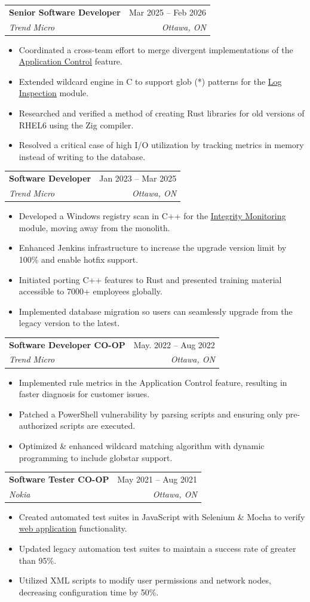 \documentclass[letterpaper,11pt]{article}
\makeatletter
\newcommand{\resumeItem}[1]{
  \item\small{
    {#1 \vspace{-2pt}}
  }
}
\newcommand{\resumeSubheading}[4]{
  \vspace{-2pt}\item
    \begin{tabular*}{0.97\textwidth}[t]{l@{\extracolsep{\fill}}r}
      \textbf{#1} & #2 \\
      \textit{\small#3} & \textit{\small #4} \\
    \end{tabular*}\vspace{-7pt}
}
\newcommand{\resumeItemListStart}{\begin{itemize}}
\newcommand{\resumeItemListEnd}{\end{itemize}\vspace{-5pt}}
\makeatother
\begin{document}
    \resumeSubheading
      {Senior Software Developer}{Mar 2025 -- Feb 2026}
      {Trend Micro}{Ottawa, ON}
      \resumeItemListStart
        \resumeItem{Coordinated a cross-team effort to merge divergent implementations of the \href{https://help.deepsecurity.trendmicro.com/20_0/on-premise/application-control.html}{\underline{Application Control}} feature.}
        \resumeItem{Extended wildcard engine in C to support glob (*) patterns for the \href{https://help.deepsecurity.trendmicro.com/20_0/on-premise/log-inspection.html}{\underline{Log Inspection}} module.}
        \resumeItem{Researched and verified a method of creating Rust libraries for old versions of RHEL6 using the Zig compiler.}
        \resumeItem{Resolved a critical case of high I/O utilization by tracking metrics in memory instead of writing to the database.}
      \resumeItemListEnd
      
    \resumeSubheading
      {Software Developer}{Jan 2023 -- Mar 2025}
      {Trend Micro}{Ottawa, ON}
      \resumeItemListStart
        \resumeItem{Developed a Windows registry scan in C++ for the \href{https://help.deepsecurity.trendmicro.com/20_0/on-premise/integrity-monitoring.html}{\underline{Integrity Monitoring}} module, moving away from the monolith.}
        \resumeItem{Enhanced Jenkins infrastructure to increase the upgrade version limit by 100\% and enable hotfix support.}
        \resumeItem{Initiated porting C++ features to Rust and presented training material accessible to 7000+ employees globally.}
        \resumeItem{Implemented database migration so users can seamlessly upgrade from the legacy version to the latest.}
      \resumeItemListEnd
      
    \resumeSubheading
      {Software Developer CO-OP}{May. 2022 -- Aug 2022}
      {Trend Micro}{Ottawa, ON}
      \resumeItemListStart
        \resumeItem{Implemented rule metrics in the Application Control feature, resulting in faster diagnosis for customer issues.}
        \resumeItem{Patched a PowerShell vulnerability by parsing scripts and ensuring only pre-authorized scripts are executed.}
        \resumeItem{Optimized \& enhanced wildcard matching algorithm with dynamic programming to include globstar support.}
    \resumeItemListEnd

    \resumeSubheading
      {Software Tester CO-OP}{May 2021 -- Aug 2021}
      {Nokia}{Ottawa, ON}
      \resumeItemListStart
        \resumeItem{Created automated test suites in JavaScript with Selenium \& Mocha to verify \href{https://www.nokia.com/networks/ip-networks/network-services-platform/}{\underline{web application}} functionality.}
        \resumeItem{Updated legacy automation test suites to maintain a success rate of greater than 95\%.}
        \resumeItem{Utilized XML scripts to modify user permissions and network nodes, decreasing configuration time by 50\%.}
      \resumeItemListEnd
\end{document}
